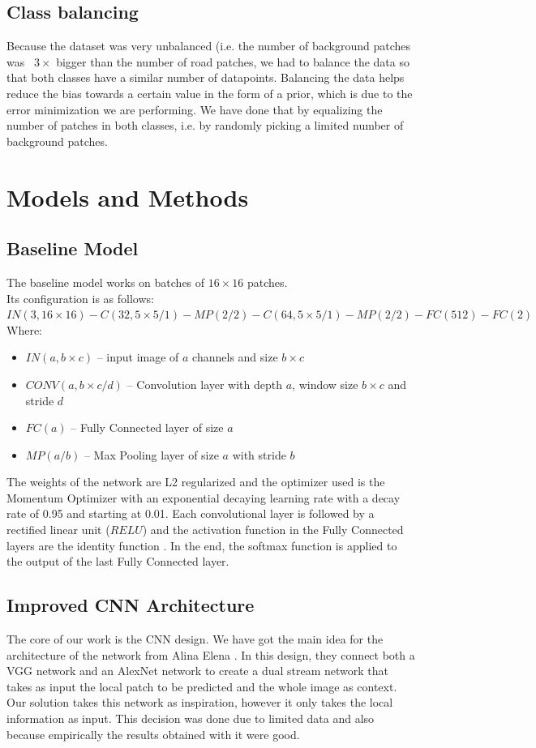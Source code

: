 \documentclass[10pt,conference,compsocconf]{IEEEtran}
\begin{document}
\subsection{Class balancing}
\label{sec:balance}
Because the dataset was very unbalanced (i.e. the number of background patches was ~$3\times$ bigger than the number of road patches, we had to balance the data so that both classes have a similar number of datapoints. Balancing the data helps reduce the bias towards a certain value in the form of a prior, which is due to the error minimization we are performing. We have done that by 
equalizing the number of patches in both classes, i.e. by randomly picking a limited number of background patches.



\section{Models and Methods}
\label{sec:model_and_methods}
\subsection{Baseline Model}
The baseline model works on batches of $16 \times 16$ patches.\\
 Its configuration is as follows:
 $IN(3, 16\times16)
-C(32, 5\times5 /1) - MP(2 / 2) - C(64, 5\times5 /1) - MP(2 / 2)
-FC(512)-FC(2)$
Where:
\begin{itemize}
\item $IN(a,b\times c)$ -- input image of $a$ channels and size $b \times  c$
\item $CONV(a,b\times c / d)$ -- Convolution layer with depth $a$, window size $b\times c$ and stride $d$
\item $FC(a)$ -- Fully Connected layer of size $a$
\item $MP(a / b)$ -- Max Pooling layer of size $a$ with stride $b$
\end{itemize}

The weights of the network are L2 regularized and the optimizer used is the Momentum Optimizer  with an exponential decaying learning rate with a decay rate of 0.95 and starting at 0.01.
Each convolutional layer is followed by a rectified linear unit ($RELU$) and the activation function in the Fully Connected layers are the identity function .
In the end, the softmax function is applied to the output of the last Fully Connected layer. 
\subsection{Improved CNN Architecture}
The core of our work is the CNN design. We have got the main idea for the architecture
of the network from Alina Elena \cite{mthesis}. In this design, they connect both a VGG network \cite{vgg} and an AlexNet network \cite{alexnet} to create a dual stream network that takes as input the local patch to be predicted and the whole image as context.
Our solution takes this network as inspiration, however it only takes the local information as input. This decision was done due to limited data and also because empirically the results obtained with it were good.
\end{document}
